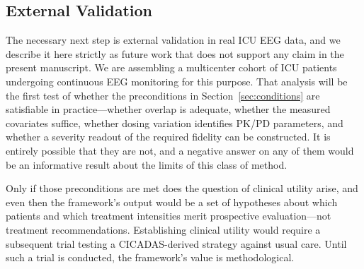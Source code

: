 \subsection{External Validation}
\label{sec:external-validation}

The necessary next step is external validation in real ICU EEG data, and we describe it here
strictly as future work that does not support any claim in the present manuscript. We are assembling
a multicenter cohort of ICU patients undergoing continuous EEG monitoring for this purpose. That
analysis will be the first test of whether the preconditions in Section~\ref{sec:conditions} are
satisfiable in practice---whether overlap is adequate, whether the measured covariates suffice,
whether dosing variation identifies PK/PD parameters, and whether a severity readout of the required
fidelity can be constructed. It is entirely possible that they are not, and a negative answer on any
of them would be an informative result about the limits of this class of method.

Only if those preconditions are met does the question of clinical utility arise, and even then the
framework's output would be a set of hypotheses about which patients and which treatment intensities
merit prospective evaluation---not treatment recommendations. Establishing clinical utility would
require a subsequent trial testing a CICADAS-derived strategy against usual care. Until such a trial
is conducted, the framework's value is methodological.

